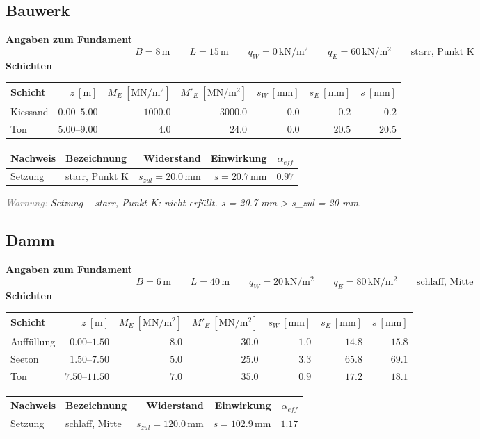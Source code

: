 \documentclass[11pt,a4paper]{article}
\newcommand{\hinweis}[2]{\par\noindent\textcolor{gray}{\textit{#1:}} \textit{#2}\par}
\begin{document}
\subsection{Bauwerk}
\noindent\textbf{Angaben zum Fundament}
\begin{equation*}
B = 8\,\mathrm{m} \qquad L = 15\,\mathrm{m} \qquad q_W = 0\,\mathrm{kN}/\mathrm{m}^{2} \qquad q_E = 60\,\mathrm{kN}/\mathrm{m}^{2} \qquad \text{starr, Punkt K}
\end{equation*}
\noindent\textbf{Schichten}
\begin{longtable}{lrrrrrr}
\hline
Schicht & $z\ [\mathrm{m}]$ & $M_E\ [\mathrm{MN}/\mathrm{m}^{2}]$ & $M'_E\ [\mathrm{MN}/\mathrm{m}^{2}]$ & $s_W\ [\mathrm{mm}]$ & $s_E\ [\mathrm{mm}]$ & $s\ [\mathrm{mm}]$ \\
\hline
\endhead
Kiessand & $0.00 – 5.00$ & $1000.0$ & $3000.0$ & $0.0$ & $0.2$ & $0.2$ \\
Ton & $5.00 – 9.00$ & $4.0$ & $24.0$ & $0.0$ & $20.5$ & $20.5$ \\
\hline
\end{longtable}
\begin{xltabular}{\linewidth}{>{\raggedright\arraybackslash}X>{\raggedright\arraybackslash}Xrrr}
\hline
Nachweis & Bezeichnung & Widerstand & Einwirkung & $\alpha_{eff}$ \\
\hline
\endhead
Setzung & starr, Punkt K & $s_{zul} = 20.0\,\mathrm{mm}$ & $s = 20.7\,\mathrm{mm}$ & $0.97$ \\
\hline
\end{xltabular}
\hinweis{Warnung}{Setzung – starr, Punkt K: nicht erfüllt. s = 20.7 mm > s\_zul = 20 mm.}
\subsection{Damm}
\noindent\textbf{Angaben zum Fundament}
\begin{equation*}
B = 6\,\mathrm{m} \qquad L = 40\,\mathrm{m} \qquad q_W = 20\,\mathrm{kN}/\mathrm{m}^{2} \qquad q_E = 80\,\mathrm{kN}/\mathrm{m}^{2} \qquad \text{schlaff, Mitte}
\end{equation*}
\noindent\textbf{Schichten}
\begin{longtable}{lrrrrrr}
\hline
Schicht & $z\ [\mathrm{m}]$ & $M_E\ [\mathrm{MN}/\mathrm{m}^{2}]$ & $M'_E\ [\mathrm{MN}/\mathrm{m}^{2}]$ & $s_W\ [\mathrm{mm}]$ & $s_E\ [\mathrm{mm}]$ & $s\ [\mathrm{mm}]$ \\
\hline
\endhead
Auffüllung & $0.00 – 1.50$ & $8.0$ & $30.0$ & $1.0$ & $14.8$ & $15.8$ \\
Seeton & $1.50 – 7.50$ & $5.0$ & $25.0$ & $3.3$ & $65.8$ & $69.1$ \\
Ton & $7.50 – 11.50$ & $7.0$ & $35.0$ & $0.9$ & $17.2$ & $18.1$ \\
\hline
\end{longtable}
\begin{xltabular}{\linewidth}{>{\raggedright\arraybackslash}X>{\raggedright\arraybackslash}Xrrr}
\hline
Nachweis & Bezeichnung & Widerstand & Einwirkung & $\alpha_{eff}$ \\
\hline
\endhead
Setzung & schlaff, Mitte & $s_{zul} = 120.0\,\mathrm{mm}$ & $s = 102.9\,\mathrm{mm}$ & $1.17$ \\
\hline
\end{xltabular}
\end{document}

